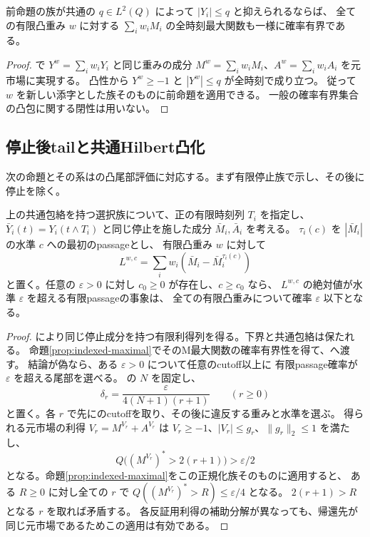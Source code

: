 \begin{corollary}[選択成分の有限凸族の確率有界性]
前命題の族が共通の $q\in L^2(Q)$ によって $|Y_i|\leq q$ と抑えられるならば、
全ての有限凸重み $w$ に対する $\sum_i w_iM_i$ の全時刻最大関数も一様に確率有界である。
\end{corollary}
\begin{proof}
で $Y^w=\sum_iw_iY_i$ と同じ重みの成分
$M^w=\sum_iw_iM_i$、$A^w=\sum_iw_iA_i$ を元市場に実現する。
凸性から $Y^w\geq-1$ と $|Y^w|\leq q$ が全時刻で成り立つ。
従って $w$ を新しい添字とした族そのものに前命題を適用できる。
一般の確率有界集合の凸包に関する閉性は用いない。
\end{proof}

\subsection{停止後tailと共通Hilbert凸化}
次の命題とその系は\cite[Lemma 4.8]{DS}の凸尾部評価に対応する。まず有限停止族で示し、その後に停止を除く。

\begin{proposition}[有限停止した選択族の凸尾部評価]\label{prop:convex-tails}
上の共通包絡を持つ選択族について、正の有限時刻列 $T_i$ を指定し、
$\bar Y_i(t)=Y_i(t\wedge T_i)$ と同じ停止を施した成分 $\bar M_i,\bar A_i$ を考える。
$\tau_i(c)$ を $|\bar M_i|$ の水準 $c$ への最初のpassageとし、
有限凸重み $w$ に対して
\[
 L^{w,c}=\sum_i w_i(\bar M_i-\bar M_i^{\tau_i(c)})
\]
と置く。任意の $\varepsilon>0$ に対し $c_0\geq0$ が存在し、$c\geq c_0$ なら、
$L^{w,c}$ の絶対値が水準 $\varepsilon$ を超える有限passageの事象は、
全ての有限凸重みについて確率 $\varepsilon$ 以下となる。
\end{proposition}
\begin{proof}
により同じ停止成分を持つ有限利得列を得る。下界と共通包絡は保たれる。
命題\ref{prop:indexed-maximal}でそのM最大関数の確率有界性を得て、へ渡す。
結論が偽なら、ある $\varepsilon>0$ について任意のcutoff以上に
有限passage確率が $\varepsilon$ を超える尾部を選べる。
の $N$ を固定し、
\[
 \delta_r=\frac{\varepsilon}{4(N+1)(r+1)}\qquad(r\geq0)
\]
と置く。各 $r$ で先にのcutoffを取り、その後に違反する重みと水準を選ぶ。
得られる元市場の利得 $V_r=M^{V_r}+A^{V_r}$ は
$V_r\geq-1$、$|V_r|\leq g_r$、$\|g_r\|_2\leq1$ を満たし、
\[
 Q\bigl((M^{V_r})^*>2(r+1)\bigr)>\varepsilon/2
\]
となる。命題\ref{prop:indexed-maximal}をこの正規化族そのものに適用すると、
ある $R\geq0$ に対し全ての $r$ で
$Q((M^{V_r})^*>R)\leq\varepsilon/4$ となる。
$2(r+1)>R$ となる $r$ を取れば矛盾する。
各反証用利得の補助分解が異なっても、帰還先が同じ元市場であるためこの適用は有効である。
\end{proof}

